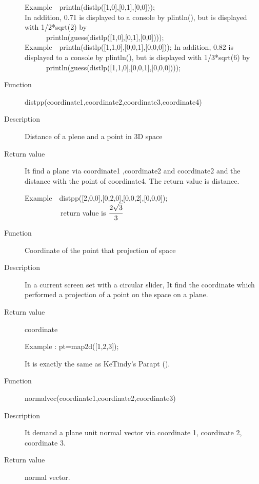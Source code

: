 \documentclass[papersize,a4paper,12pt]{article}
\begin{document}
\begin{description}
Example　println(distlp([1,0],[0,1],[0,0]));  \\
In addition, 0.71 is displayed to a console by plintln(), but is displayed with 1/2*sqrt(2)  by \\
　　　println(guess(distlp([1,0],[0,1],[0,0])));\\

Example　println(distlp([1,1,0],[0,0,1],[0,0,0]));  
In addition, 0.82 is displayed to a console by plintln(), but is displayed with 1/3*sqrt(6)   by \\
　　　println(guess(distlp([1,1,0],[0,0,1],[0,0,0])));\\


\vspace{\baselineskip}
\hypertarget{distpp}{}
\item[Function] distpp(coordinate1,coordinate2,coordinate3,coordinate4)
\item[Description] Distance of a plene and a point in 3D space
\item[Return value] It find a plane via coordinate1 ,coordinate2 and coordinate2 and the distance with the point of coordinate4. The return value is distance.

Example　distpp([2,0,0],[0,2,0],[0,0,2],[0,0,0]);\\
　　　　　return value is $\cfrac{2\sqrt{3}}{3}$ \\

\vspace{\baselineskip}
\hypertarget{map2d}{}
\item[Function] Coordinate of the point that projection of space
\item[Description] In a current screen set with a circular slider, It find the coordinate which performed a projection of a point on the space on a plane.
\item[Return value] coordinate

Example :  pt=map2d([1,2,3]);

It is exactly the same as KeTindy's Parapt ().


\hypertarget{normalvec}{}
\item[Function] normalvec(coordinate1,coordinate2,coordinate3)
\item[Description] It demand a plane unit normal vector via coordinate 1, coordinate 2, coordinate 3.
\item[Return value] normal vector.


\end{description}
\end{document}
